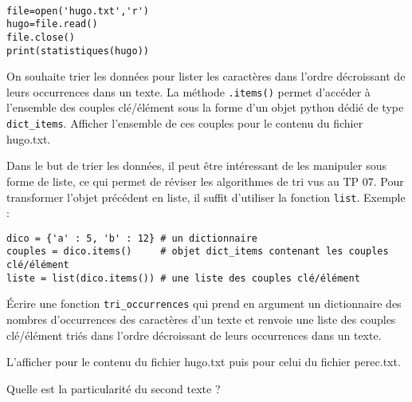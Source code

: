 \begin{solution}~\
\begin{verbatim}
file=open('hugo.txt','r')
hugo=file.read()
file.close()
print(statistiques(hugo))
\end{verbatim}
\end{solution}

\begin{exercice}
On souhaite trier les données pour lister les caractères dans l'ordre décroissant de leurs occurrences dans un texte. La méthode \texttt{.items()} permet d'accéder à l'ensemble des couples clé/élément sous la forme d'un objet python dédié de type \verb?dict_items?. Afficher l'ensemble de ces couples pour le contenu du fichier hugo.txt.

Dans le but de trier les données, il peut être intéressant de les manipuler sous forme de liste, ce qui permet de réviser les algorithmes de tri vus au TP 07. Pour transformer l'objet précédent en liste, il suffit d'utiliser la fonction \texttt{list}. Exemple :
\begin{verbatim}
dico = {'a' : 5, 'b' : 12} # un dictionnaire
couples = dico.items()     # objet dict_items contenant les couples clé/élément
liste = list(dico.items()) # une liste des couples clé/élément
\end{verbatim}

Écrire une fonction \verb?tri_occurrences? qui prend en argument un dictionnaire des nombres d'occurrences des caractères d'un texte et renvoie une liste des couples clé/élément triés dans l'ordre décroissant de leurs occurrences dans un texte.

L'afficher pour le contenu du fichier hugo.txt puis pour celui du fichier perec.txt.

Quelle est la particularité du second texte ?
\end{exercice}

